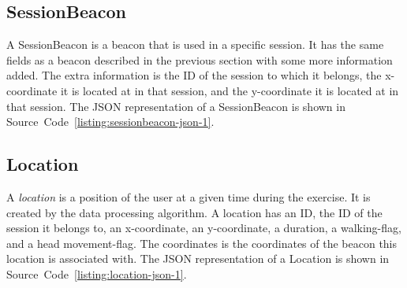 \documentclass[../Main/thesis.tex]{subfiles}
\begin{document}

\subsection{SessionBeacon}
A SessionBeacon is a beacon that is used in a specific session.
It has the same fields as a beacon described in the previous section with some more information added.
The extra information is the ID of the session to which it belongs, the x-coordinate it is located at in that session, and the y-coordinate it is located at in that session.
The JSON representation of a SessionBeacon is shown in Source~Code~\ref{listing:sessionbeacon-json-1}.


\subsection{Location}
A \textit{location} is a position of the user at a given time during the exercise.
It is created by the data processing algorithm.
A location has an ID, the ID of the session it belongs to, an x-coordinate, an y-coordinate, a duration, a walking-flag, and a head movement-flag.
The coordinates is the coordinates of the beacon this location is associated with.
The JSON representation of a Location is shown in Source~Code~\ref{listing:location-json-1}.

\end{document}
